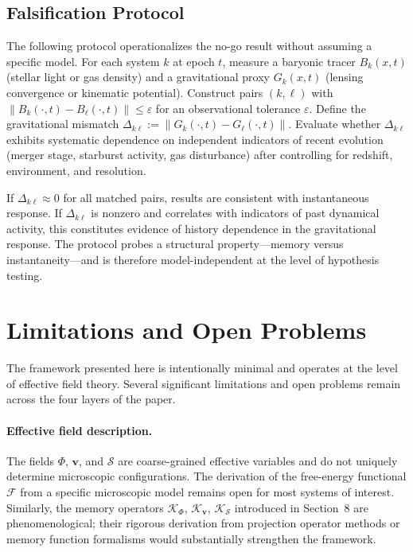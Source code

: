 \documentclass[11pt, a4paper, twocolumn]{article}
\newcommand{\Sfield}{\mathcal{S}}
\newcommand{\F}{\mathcal{F}}
\begin{document}
\subsection{Falsification Protocol}

The following protocol operationalizes the no-go result without assuming a
specific model. For each system $k$ at epoch $t$, measure a baryonic tracer
$B_k(x,t)$ (stellar light or gas density) and a gravitational proxy $G_k(x,t)$
(lensing convergence or kinematic potential). Construct pairs $(k,\ell)$ with
$\|B_k(\cdot,t) - B_\ell(\cdot,t)\| \leq \varepsilon$ for an observational
tolerance $\varepsilon$. Define the gravitational mismatch $\Delta_{k\ell} :=
\|G_k(\cdot,t) - G_\ell(\cdot,t)\|$. Evaluate whether $\Delta_{k\ell}$ exhibits
systematic dependence on independent indicators of recent evolution (merger
stage, starburst activity, gas disturbance) after controlling for redshift,
environment, and resolution.

If $\Delta_{k\ell} \approx 0$ for all matched pairs, results are consistent
with instantaneous response. If $\Delta_{k\ell}$ is nonzero and correlates
with indicators of past dynamical activity, this constitutes evidence of
history dependence in the gravitational response. The protocol probes a
structural property---memory versus instantaneity---and is therefore
model-independent at the level of hypothesis testing.

\section{Limitations and Open Problems}

The framework presented here is intentionally minimal and operates at the level
of effective field theory. Several significant limitations and open problems
remain across the four layers of the paper.

\paragraph{Effective field description.}
The fields $\Phi$, $\mathbf{v}$, and $\Sfield$ are coarse-grained effective
variables and do not uniquely determine microscopic configurations. The
derivation of the free-energy functional $\F$ from a specific microscopic model
remains open for most systems of interest. Similarly, the memory operators
$\mathcal{K}_\Phi$, $\mathcal{K}_{\mathbf{v}}$, $\mathcal{K}_{\Sfield}$
introduced in Section~8 are phenomenological; their rigorous derivation from
projection operator methods or memory function formalisms would substantially
strengthen the framework.
\end{document}
